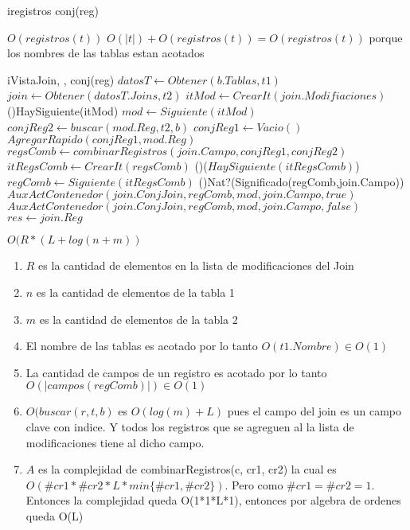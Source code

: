 \begin{Algoritmos}
\begin{algoritmo}{iregistros}{ }{conj(reg)}
\end{algoritmo}

\datosAlgoritmo{} %
{} %
{} %
{$O(registros(t))$} %
{$O(|t|) + O(registros(t)) = O(registros(t))$ porque los nombres de las tablas estan acotados} %


\begin{algoritmo}{iVistaJoin}{, , }{conj(reg)}
    $datosT \gets Obtener(b.Tablas, t1)$ 
    $join \gets Obtener(datosT.Joins, t2) $ 
    $itMod \gets CrearIt(join.Modifiaciones) $ 
	\While(){HaySiguiente(itMod)}{
    	$ mod \gets Siguiente(itMod) $ 
        $conjReg2 \gets buscar(mod.Reg, t2, b)$ 
        $conjReg1 \gets Vacio() $ 
        $AgregarRapido(conjReg1, mod.Reg) $ 
        $regsComb \gets combinarRegistros(join.Campo, conjReg1, conjReg2)$ 
        $itRegsComb \gets CrearIt(regsComb) $ 
        \While(){($HaySiguiente(itRegsComb)$)}{
            $regComb \gets Siguiente(itRegsComb) $  
        	\eIf(){Nat?(Significado(regComb,join.Campo))}{
				$AuxActContenedor(join.ConjJoin, regComb, mod, join.Campo, true)$ 
        	}
        	{
				$AuxActContenedor(join.ConjJoin, regComb, mod, join.Campo, false)$ 
			}
		}
    }
    $ res \gets join.Reg $ 
\end{algoritmo}
\datosAlgoritmo{} %
{} %
{} %
{$O(R*(L+log(n+m))$} %
{\begin{enumerate}
\item $R$ es la cantidad de elementos en la lista de modificaciones del Join
\item $n$ es la cantidad de elementos de la tabla 1
\item $m$ es la cantidad de elementos de la tabla 2
\item El nombre de las tablas es acotado por lo tanto $O(t1.Nombre) \in O(1)$
\item La cantidad de campos de un registro es acotado por lo tanto $O(|campos(regComb)|) \in O(1)$
\item $O(buscar(r,t,b)$ es $O(log(m) + L)$ pues el campo del join es un campo clave con indice. Y todos los registros que se agreguen al la lista de modificaciones tiene al dicho campo.
\item $A$ es la complejidad de combinarRegistros(c, cr1, cr2) la cual es $O(\#cr1*\#cr2*L*min\lbrace \#cr1, \#cr2\rbrace)$. Pero como $\#cr1 = \#cr2 = 1$. Entonces la complejidad queda O(1*1*L*1), entonces por algebra de ordenes queda O(L)

\end{enumerate}}
\end{Algoritmos}

